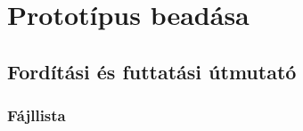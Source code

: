 %
\chapter{Prototípus beadása}

\thispagestyle{fancy}

\section{Fordítási és futtatási útmutató}

\subsection{Fájllista}

